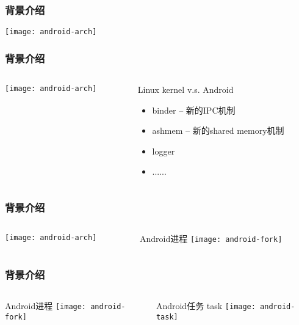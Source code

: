 \begin{frame}[plain]
	\frametitle{背景介绍}
	\centering
	\texttt{[image: android-arch]}
	
\end{frame}
\begin{frame}[fragile]
	\frametitle{背景介绍}
	
	\begin{columns}
		\begin{column}{.4\textwidth}
			
			\texttt{[image: android-arch]}
			
		\end{column}
		\begin{column}{.6\textwidth}
			Linux kernel v.s. Android
			\begin{itemize}
				\item binder -- 新的IPC机制
				\item ashmem -- 新的shared memory机制
				\item logger
				\item ......
			\end{itemize}
		\end{column}
	\end{columns}
\end{frame}


\begin{frame}[fragile]
	\frametitle{背景介绍}
	
	\begin{columns}
		\begin{column}{.4\textwidth}
			
			\texttt{[image: android-arch]}
			
		\end{column}
		\begin{column}{.6\textwidth}
			Android进程
			\texttt{[image: android-fork]}

		\end{column}
	\end{columns}
\end{frame}


\begin{frame}[fragile]
	\frametitle{背景介绍}
	
	\begin{columns}
		\begin{column}{.5\textwidth}
			Android进程
			\texttt{[image: android-fork]}
			
		\end{column}
		\begin{column}{.5\textwidth}
			Android任务 task
			\texttt{[image: android-task]}
			
		\end{column}
	\end{columns}
\end{frame}

